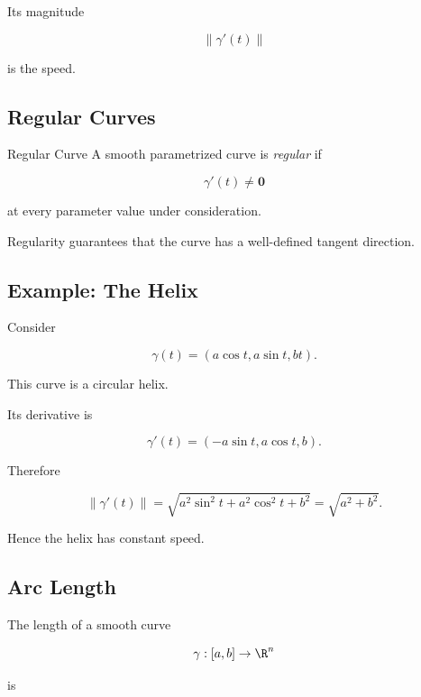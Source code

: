 Its magnitude

\[
\boxed{
\|\gamma'(t)\|
}
\]

is the speed.

\subsection{Regular Curves}
\label{subsec:regular-curves}

\begin{definitionbox}{Regular Curve}
A smooth parametrized curve is \emph{regular} if

\[
\boxed{
\gamma'(t)\neq\mathbf{0}
}
\]

at every parameter value under consideration.
\end{definitionbox}

Regularity guarantees that the curve has a well-defined tangent direction.

\subsection{Example: The Helix}
\label{subsec:helix-example}

Consider

\[
\boxed{
\gamma(t)
=
(a\cos t,a\sin t,bt).
}
\]

This curve is a circular helix.

Its derivative is

\[
\gamma'(t)
=
(-a\sin t,a\cos t,b).
\]

Therefore

\[
\|\gamma'(t)\|
=
\sqrt{a^2\sin^2t+a^2\cos^2t+b^2}
=
\sqrt{a^2+b^2}.
\]

Hence the helix has constant speed.

\subsection{Arc Length}
\label{subsec:differential-geometry-arc-length}

The length of a smooth curve

\[
\gamma:[a,b]\to\R^n
\]

is

